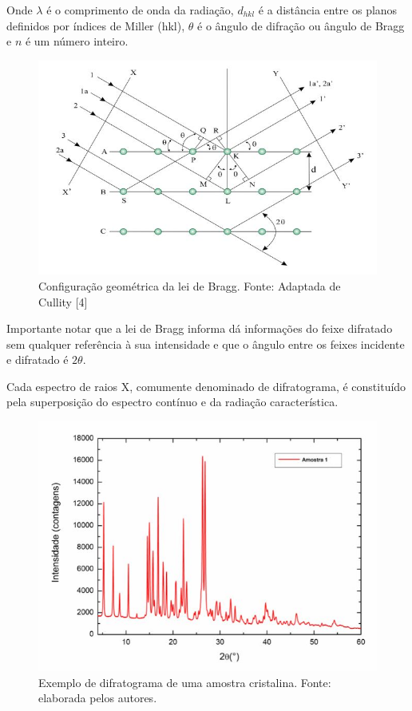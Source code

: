 \documentclass[article,12pt,openright,oneside,a4paper,brazil]{abntex2}
\begin{document}
Onde $\lambda$ é o comprimento de onda da radiação, $d_{hkl}$ é a distância entre os planos definidos por índices de Miller (hkl), $\theta$ é o ângulo de difração ou ângulo de Bragg e $n$ é um número inteiro.
\begin{figure}[H]
    \centering
    \includegraphics[scale=0.7]{Figuras/leidebragg.jpg}
    \caption{Configuração geométrica da lei de Bragg. Fonte: Adaptada de Cullity [4]}
    \label{fig:ex}
\end{figure}
Importante notar que a lei de Bragg informa dá informações do feixe difratado sem qualquer referência à sua intensidade e que o ângulo entre os feixes incidente e difratado é $2\theta$.

Cada espectro de raios X, comumente denominado de difratograma, é constituído pela superposição do espectro contínuo e da radiação característica.
\begin{figure}[H]
    \centering
    \includegraphics[scale=0.7]{Figuras/ex.jpg}
    \caption{Exemplo de difratograma de uma amostra cristalina. Fonte: elaborada pelos autores.}
    \label{fig:ex}
\end{figure}
\end{document}
